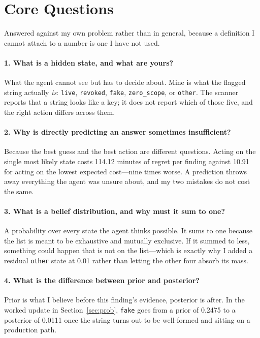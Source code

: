 \documentclass{article}
\begin{document}
\section{Core Questions}
\label{app:core}

Answered against my own problem rather than in general, because a definition I
cannot attach to a number is one I have not used.

\paragraph{1. What is a hidden state, and what are yours?}
What the agent cannot see but has to decide about. Mine is what the flagged
string actually \emph{is}: \texttt{live}, \texttt{revoked}, \texttt{fake},
\texttt{zero\_scope}, or \texttt{other}. The scanner reports that a string looks
like a key; it does not report which of those five, and the right action differs
across them.

\paragraph{2. Why is directly predicting an answer sometimes insufficient?}
Because the best guess and the best action are different questions. Acting on the
single most likely state costs 114.12 minutes of regret per finding against 10.91
for acting on the lowest expected cost---nine times worse. A prediction throws
away everything the agent was unsure about, and my two mistakes do not cost the
same.

\paragraph{3. What is a belief distribution, and why must it sum to one?}
A probability over every state the agent thinks possible. It sums to one because
the list is meant to be exhaustive and mutually exclusive. If it summed to less,
something could happen that is not on the list---which is exactly why I added a
residual \texttt{other} state at 0.01 rather than letting the other four absorb
its mass.

\paragraph{4. What is the difference between prior and posterior?}
Prior is what I believe before this finding's evidence, posterior is after. In the
worked update in Section~\ref{sec:prob}, \texttt{fake} goes from a prior of 0.2475
to a posterior of 0.0111 once the string turns out to be well-formed and sitting
on a production path.
\end{document}
